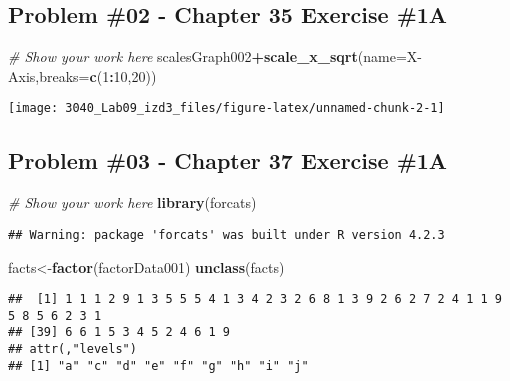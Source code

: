 \documentclass[
]{article}
\newenvironment{Shaded}{\begin{snugshade}}{\end{snugshade}}
\newcommand{\AttributeTok}[1]{\textcolor[rgb]{0.13,0.29,0.53}{#1}}
\newcommand{\CommentTok}[1]{\textcolor[rgb]{0.56,0.35,0.01}{\textit{#1}}}
\newcommand{\DecValTok}[1]{\textcolor[rgb]{0.00,0.00,0.81}{#1}}
\newcommand{\FunctionTok}[1]{\textcolor[rgb]{0.13,0.29,0.53}{\textbf{#1}}}
\newcommand{\NormalTok}[1]{#1}
\newcommand{\OtherTok}[1]{\textcolor[rgb]{0.56,0.35,0.01}{#1}}
\newcommand{\SpecialCharTok}[1]{\textcolor[rgb]{0.81,0.36,0.00}{\textbf{#1}}}
\newcommand{\StringTok}[1]{\textcolor[rgb]{0.31,0.60,0.02}{#1}}
\begin{document}
\newpage

\hypertarget{problem-02---chapter-35-exercise-1a}{%
\subsection{Problem \#02 - Chapter 35 Exercise
\#1A}\label{problem-02---chapter-35-exercise-1a}}

\begin{Shaded}
\begin{Highlighting}[]
\CommentTok{\# Show your work here}
\NormalTok{scalesGraph002}\SpecialCharTok{+}\FunctionTok{scale\_x\_sqrt}\NormalTok{(}\AttributeTok{name=}\StringTok{\textquotesingle{}X{-}Axis\textquotesingle{}}\NormalTok{,}\AttributeTok{breaks=}\FunctionTok{c}\NormalTok{(}\DecValTok{1}\SpecialCharTok{:}\DecValTok{10}\NormalTok{,}\DecValTok{20}\NormalTok{))}
\end{Highlighting}
\end{Shaded}

\texttt{[image: 3040\_Lab09\_izd3\_files/figure-latex/unnamed-chunk-2-1]}

\newpage

\hypertarget{problem-03---chapter-37-exercise-1a}{%
\subsection{Problem \#03 - Chapter 37 Exercise
\#1A}\label{problem-03---chapter-37-exercise-1a}}

\begin{Shaded}
\begin{Highlighting}[]
\CommentTok{\# Show your work here}
\FunctionTok{library}\NormalTok{(forcats)}
\end{Highlighting}
\end{Shaded}

\begin{verbatim}
## Warning: package 'forcats' was built under R version 4.2.3
\end{verbatim}

\begin{Shaded}
\begin{Highlighting}[]
\NormalTok{facts}\OtherTok{\textless{}{-}}\FunctionTok{factor}\NormalTok{(factorData001)}
\FunctionTok{unclass}\NormalTok{(facts)}
\end{Highlighting}
\end{Shaded}

\begin{verbatim}
##  [1] 1 1 1 2 9 1 3 5 5 5 4 1 3 4 2 3 2 6 8 1 3 9 2 6 2 7 2 4 1 1 9 5 8 5 6 2 3 1
## [39] 6 6 1 5 3 4 5 2 4 6 1 9
## attr(,"levels")
## [1] "a" "c" "d" "e" "f" "g" "h" "i" "j"
\end{verbatim}
\end{document}
